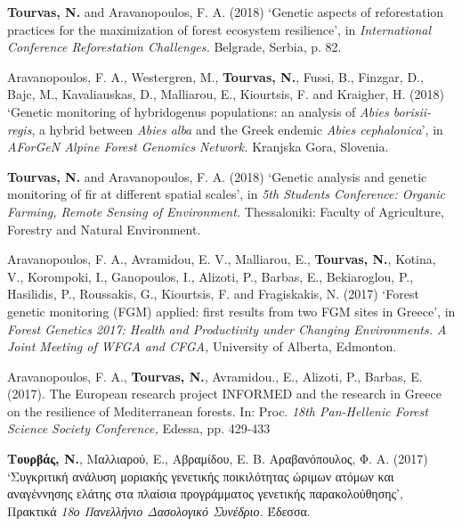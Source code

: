 \documentclass[12pt,]{scrartcl}
\begin{document}
\vspace{-3mm}
\begin{enumerate}
\leftskip-0.13in
	\setcounter{enumi}{1}
	
\leftskip-0.07in  

\leftskip-0.07in  
\item {\textbf{Tourvas, N.} and Aravanopoulos, F. A. (2018) ‘Genetic aspects of reforestation practices for the maximization of forest ecosystem resilience’, in \textit{International Conference Reforestation Challenges.} Belgrade, Serbia, p. 82.}

\leftskip-0.07in  
\item {Aravanopoulos, F. A., Westergren, M., \textbf{Tourvas, N.}, Fussi, B., Finzgar, D., Bajc, M., Kavaliauskas, D., Malliarou, E., Kiourtsis, F. and Kraigher, H. (2018) ‘Genetic monitoring of hybridogenus populations: an analysis of \textit{Abies borisii-regis}, a hybrid between \textit{Abies alba }and the Greek endemic \textit{Abies cephalonica}’, in \textit{AForGeN Alpine Forest Genomics Network.} Kranjska Gora, Slovenia.}

\item {\textbf{Tourvas, N.} and Aravanopoulos, F. A. (2018) ‘Genetic analysis and genetic monitoring of fir at different spatial scales’, in \textit{5th Students Conference: Organic Farming, Remote Sensing of Environment.} Thessaloniki: Faculty of Agriculture, Forestry and Natural Environment.

\leftskip-0.07in  
\item {Aravanopoulos, F. A., Avramidou, E. V., Malliarou, E., \textbf{Tourvas, N.}, Kotina, V., Korompoki, I., Ganopoulos, I., Alizoti, P., Barbas, E., Bekiaroglou, P., Hasilidis, P., Roussakis, G., Kiourtsis, F. and Fragiskakis, N. (2017) ‘Forest genetic monitoring (FGM) applied: first results from two FGM sites in Greece’, in \textit{Forest Genetics 2017: Health and Productivity under Changing Environments. A Joint Meeting of WFGA and CFGA,} University of Alberta, Edmonton.}

\leftskip-0.07in  
\item {Aravanopoulos, F. Α., \textbf{Tourvas, N.}, Avramidou., E., Alizoti, P., Barbas, E. (2017). The European research project INFORMED and the research in Greece on the resilience of Mediterranean forests. In: Proc. \textit{18th Pan-Hellenic Forest Science Society Conference,} Edessa, pp. 429-433}
 
\leftskip-0.07in  
\item {\textbf{Τουρβάς, Ν.}, Μαλλιαρού, E., Αβραμίδου, Ε. Β. Αραβανόπουλος, Φ. Α. (2017) ‘Συγκριτική ανάλυση μοριακής γενετικής ποικιλότητας ώριμων ατόμων και αναγέννησης ελάτης στα πλαίσια προγράμματος γενετικής παρακολούθησης’, Πρακτικά \textit{18ο Πανελλήνιο Δασολογικό Συνέδριο.} Έδεσσα.}

}
\end{enumerate}
\end{document}

